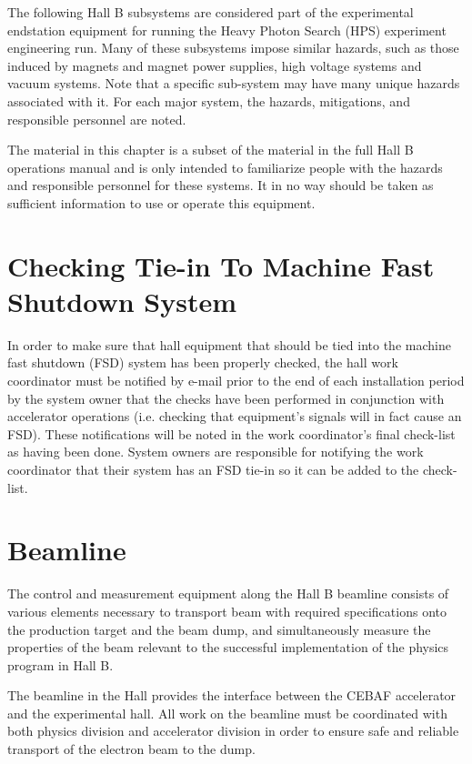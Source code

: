 \documentclass[11pt]{report}
\begin{document}
The following Hall B subsystems are considered part of the experimental endstation equipment for running the Heavy Photon Search (HPS) experiment engineering run.
Many of these subsystems impose similar hazards, such as those induced by magnets and magnet power supplies,
high voltage systems and vacuum systems.  Note that a specific sub-system may have many unique hazards associated with it.
For each major system, the hazards, mitigations, and responsible personnel are noted.

The material in this chapter is a subset of the material in the full Hall B operations manual and is only intended to familiarize
people with the hazards and responsible personnel for these systems.  It in no way should be taken as sufficient information to use or operate this equipment.

\section{Checking Tie-in To Machine Fast Shutdown System}
\indent

In order to make sure that hall equipment that should be tied into the machine fast shutdown (FSD) system
has been properly checked, the hall work coordinator must be notified by e-mail prior to the end of each
installation period by the system owner
that the checks have been performed in conjunction with accelerator operations (i.e. checking that equipment's signals
will in fact cause an FSD).  These notifications will be
noted in the work coordinator's final check-list as having been done.   System owners are responsible
for notifying the work coordinator that their system has an FSD tie-in so it can be added to the check-list.

\section{Beamline}
\indent

The control and measurement equipment along the Hall B beamline consists of various elements necessary to transport beam with required specifications onto the production target and the beam dump, and simultaneously measure the properties of the beam relevant to the successful implementation of the physics program in Hall B. 

The beamline in the Hall provides the interface between the CEBAF accelerator and the experimental hall. All work on the beamline must be coordinated with both physics division and accelerator division in order to ensure safe and reliable transport of the electron beam to the dump.
\end{document}
